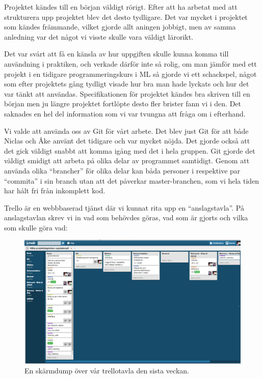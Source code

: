 Projektet kändes till en början väldigt rörigt. Efter att ha arbetat med att strukturera upp projektet blev det desto tydligare. Det var mycket i projektet som kändes främmande, vilket gjorde allt aningen jobbigt, men av samma anledning var det något vi visste skulle vara väldigt lärorikt. 

Det var svårt att få en känsla av hur uppgiften skulle kunna komma till användning i praktiken, och verkade därför inte så rolig, om man jämför med ett projekt i en tidigare programmeringskurs i ML så gjorde vi ett schackspel, något som efter projektets gång tydligt visade hur bra man hade lyckats och hur det var tänkt att användas. Specifikationen för projektet kändes bra skriven till en början men ju längre projektet fortlöpte desto fler brister fann vi i den. Det saknades en hel del information som vi var tvungna att fråga om i efterhand.

Vi valde att använda oss av Git för vårt arbete. Det blev just Git för att både Niclas och Åke använt det tidigare och var mycket nöjda. Det gjorde också att det gick väldigt snabbt att komma igång med det i hela gruppen. Git gjorde det väldigt smidigt att arbeta på olika delar av programmet samtidigt. Genom att använda olika “brancher” för olika delar kan båda personer i respektive par “commita” i sin branch utan att det påverkar master-branchen, som vi hela tiden har hålt fri från inkomplett kod.

Trello är en webbbaserad tjänst där vi kunnat rita upp en “anslagstavla”. På anslagstavlan skrev vi in vad som behövdes göras, vad som är gjorts och vilka som skulle göra vad:

\begin{figure}[H]
  \includegraphics[width=\columnwidth]{images/trello.png}
  \caption{En skärmdump över vår trellotavla den sista veckan.}
  \label{fig:trello}
\end{figure}

